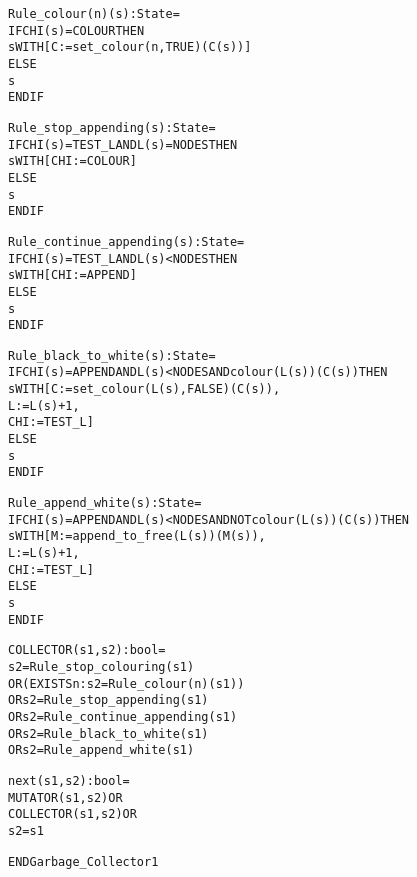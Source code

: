 \begin{alltt}
  Rule_colour(n)(s):State =
    IF CHI(s) = COLOUR THEN
      s WITH [C := set_colour(n,TRUE)(C(s))]
    ELSE
      s
    ENDIF

  Rule_stop_appending(s):State =
    IF CHI(s) = TEST_L AND L(s) = NODES THEN
      s WITH [CHI := COLOUR]
    ELSE
      s
    ENDIF

  Rule_continue_appending(s):State =
    IF CHI(s) = TEST_L AND L(s) < NODES THEN
      s WITH [CHI := APPEND]
    ELSE 
      s 
    ENDIF

  Rule_black_to_white(s):State =
    IF CHI(s) = APPEND AND L(s) < NODES AND colour(L(s))(C(s)) THEN
      s WITH [C := set_colour(L(s),FALSE)(C(s)),
              L := L(s)+1,
              CHI := TEST_L]
    ELSE 
      s 
    ENDIF

  Rule_append_white(s):State =
    IF CHI(s) = APPEND AND L(s) < NODES AND NOT colour(L(s))(C(s)) THEN
      s WITH [M := append_to_free(L(s))(M(s)),
              L := L(s) + 1,
              CHI := TEST_L]
    ELSE 
      s 
    ENDIF

  COLLECTOR(s1,s2):bool =
       s2 = Rule_stop_colouring(s1) 
    OR (EXISTS n: s2 = Rule_colour(n)(s1))
    OR s2 = Rule_stop_appending(s1) 
    OR s2 = Rule_continue_appending(s1) 
    OR s2 = Rule_black_to_white(s1) 
    OR s2 = Rule_append_white(s1)

  %%%%%%%%%%%%%%%%%%%%%%%%%%%
  % The Transition Relation %
  %%%%%%%%%%%%%%%%%%%%%%%%%%%

  next(s1,s2):bool =
    MUTATOR(s1,s2) OR
    COLLECTOR(s1,s2) OR
    s2 = s1

END Garbage_Collector1
\end{alltt}





